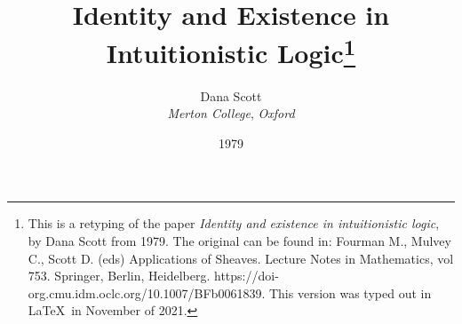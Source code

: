 %
%
%

\usepackage[papersize={6.7in, 10.0in}, left=.5in, right=.5in, top=1in, bottom=.9in]{geometry}
\linespread{1.1}
\raggedbottom
\pagestyle{plain}
\usepackage{mathpartir}
\usepackage{stmaryrd}
\usepackage{mathtools}
\usepackage{tikz-cd}
\usepackage{microtype}
\usepackage{amssymb}




\usepackage[small]{titlesec}
\usepackage{cite}

\setcounter{tocdepth}{3}

\def\to{\rightarrow}
\def\imp{\shortrightarrow}
\def\iff{\leftrightarrow}
\def\union{\cup}
\def\inc{\subseteq}
\def\dom{\mathop{\rm dom}}
\def\cod{\mathop{\rm cod}}
\def\id{{\mathrm 1}}
\def\res{\!\upharpoonleft\!}
\def\ffam{\varphi}
\def\comp{\circ}
\def\bbone{\mathbb 1}
\def\zeromap{0}
\def\bbzero{{\mathbb O}}
\def\ccc{{c.c.c.}}
\def\ev{\varepsilon}
\def\ebc{\varepsilon_{BC}}
\def\L{\Lambda}
\def\l{\lambda}
\def\lm#1.#2{\lambda#1.\, #2}
\def\br#1{[\, #1 \, ]}
\def\V{V}
\def\U{U}
\def\D{D}
\def\C{\mathcal C}
\def\S{\mathcal S}
\def\lxy{\l x\, \l y . \,}
\def\lmm#1#2.#3{\l #1\, \l #2 . \, #3}
\def\sss{(*\!*\!*)}
\def\ss{(**)}
\def\ssn{(**_n)}
\def\scop{\S^{\C^{op}}}
\def\PU{\mathcal P U}
\def\P{\mathcal P}
\def\UU{(U\to U)}
\def\BA{B \to A}
\def\AB{A \to B}

\def\beq{\begin{equation}}
\def\eeq{\end{equation}}
\def\beqq{\begin{equation*}}
\def\eeqq{\end{equation*}}

\makeatletter
\newcommand*\dotop{\mathpalette\bigcdot@{.6}}
\newcommand*\bigcdot@[2]{\mathbin{\vcenter{\hbox{\scalebox{#2}{$\m@th#1\bullet$}}}}}
\makeatother

\title{\large Identity and Existence in Intuitionistic Logic\footnote{This is a retyping of the paper {\it Identity and existence in intuitionistic logic}, by Dana Scott from 1979. The original can be found in: Fourman M., Mulvey C., Scott D. (eds) Applications of Sheaves. Lecture Notes in Mathematics, vol 753. Springer, Berlin, Heidelberg. https://doi-org.cmu.idm.oclc.org/10.1007/BFb0061839. This version was typed out in \LaTeX\ in November of 2021.}
}
\author{\normalsize Dana Scott \\
{\small {\small\it Merton College}, {\small\it Oxford}}}
\date{\small 1979}



